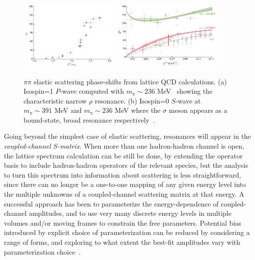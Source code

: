 \begin{figure}
\includegraphics[width=0.44\textwidth]{figures/bulava}
\includegraphics[width=0.48\textwidth]{figures/sigma}
\caption{$\pi\pi$ elastic scattering phase-shifts from lattice QCD calculations. (a) Isospin=1 $P$-wave computed with $m_\pi \sim 236$ MeV~\cite{Bulava:2016mks} showing the characteristic narrow $\rho$ resonance. (b) Isospin=0 $S$-wave at $m_\pi \sim 391$ MeV and $m_\pi \sim 236$ MeV where the $\sigma$ meson appears as a bound-state, broad resonance respectively~\cite{Briceno:2016mjc}.}
\label{elastic}
\end{figure}


Going beyond the simplest case of elastic scattering, resonances will appear in the \emph{coupled-channel $S$-matrix}. When more than one hadron-hadron channel is open, the lattice spectrum calculation can be still be done, by extending the operator basis to include hadron-hadron operators of the relevant species, but the analysis to turn this spectrum into information about scattering is less straightforward, since there can no longer be a one-to-one mapping of any given energy level into the multiple unknowns of a coupled-channel scattering matrix at that energy. A successful approach has been to parameterize the energy-dependence of coupled-channel amplitudes, and to use very many discrete energy levels in multiple volumes and/or moving frames to constrain the free parameters. Potential bias introduced by explicit choice of parameterization can be reduced by considering a range of forms, and exploring to what extent the best-fit amplitudes vary with parameterization choice~\cite{Dudek:2014qha, Wilson:2014cna, Wilson:2015dqa, Moir:2016srx, Dudek:2016cru, Briceno:2017qmb}. 

